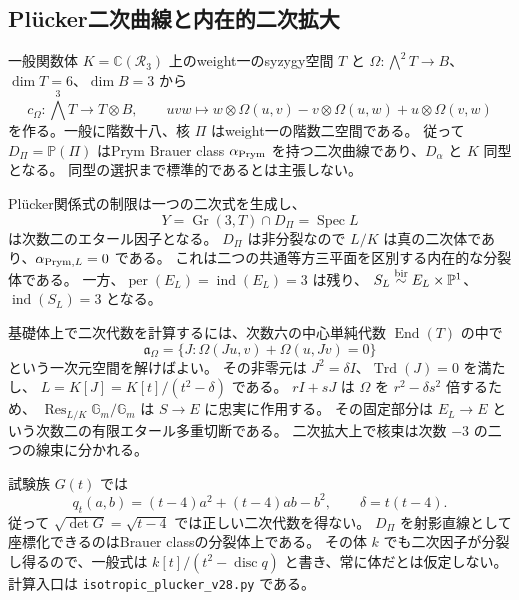 \subsection{Pl\"ucker二次曲線と内在的二次拡大}
\label{subsec:notes-quadratic-splitting-v28}

一般関数体 $K=\mathbb C(\mathcal R_3)$ 上のweight一のsyzygy空間 $T$ と
$\Omega:\bigwedge^2T\to B$、$\dim T=6$、$\dim B=3$ から
\[
 c_\Omega:\bigwedge^3T\to T\otimes B,\qquad
 uvw\mapsto w\otimes\Omega(u,v)-v\otimes\Omega(u,w)+u\otimes\Omega(v,w)
\]
を作る。一般に階数十八、核 $\Pi$ はweight一の階数二空間である。
従って $D_\Pi=\mathbb P(\Pi)$ はPrym Brauer class
$\alpha_{\rm Prym}$ を持つ二次曲線であり、$D_\alpha$ と $K$ 同型となる。
同型の選択まで標準的であるとは主張しない。

Pl\"ucker関係式の制限は一つの二次式を生成し、
\[
 Y=\operatorname{Gr}(3,T)\cap D_\Pi=\operatorname{Spec}L
\]
は次数二のエタール因子となる。
$D_\Pi$ は非分裂なので $L/K$ は真の二次体であり、$\alpha_{{\rm Prym},L}=0$ である。
これは二つの共通等方三平面を区別する内在的な分裂体である。
一方、$\operatorname{per}(E_L)=\operatorname{ind}(E_L)=3$ は残り、
$S_L\mathrel{\overset{\mathrm{bir}}{\sim}} E_L\times\mathbb P^1$、$\operatorname{ind}(S_L)=3$ となる。

基礎体上で二次代数を計算するには、次数六の中心単純代数 $\operatorname{End}(T)$ の中で
\[
 \mathfrak a_\Omega=\{J:\Omega(Ju,v)+\Omega(u,Jv)=0\}
\]
という一次元空間を解けばよい。
その非零元は $J^2=\delta I$、$\operatorname{Trd}(J)=0$ を満たし、
$L=K[J]=K[t]/(t^2-\delta)$ である。
$rI+sJ$ は $\Omega$ を $r^2-\delta s^2$ 倍するため、
$\operatorname{Res}_{L/K}\mathbb G_m/\mathbb G_m$ は $S\to E$ に忠実に作用する。
その固定部分は $E_L\to E$ という次数二の有限エタール多重切断である。
二次拡大上で核束は次数 $-3$ の二つの線束に分かれる。

試験族 $G(t)$ では
\[
 q_t(a,b)=(t-4)a^2+(t-4)ab-b^2,\qquad \delta=t(t-4).
\]
従って $\sqrt{\det G}=\sqrt{t-4}$ では正しい二次代数を得ない。
$D_\Pi$ を射影直線として座標化できるのはBrauer classの分裂体上である。
その体 $k$ でも二次因子が分裂し得るので、一般式は
$k[t]/(t^2-\operatorname{disc}q)$ と書き、常に体だとは仮定しない。
計算入口は \nolinkurl{isotropic_plucker_v28.py} である。
